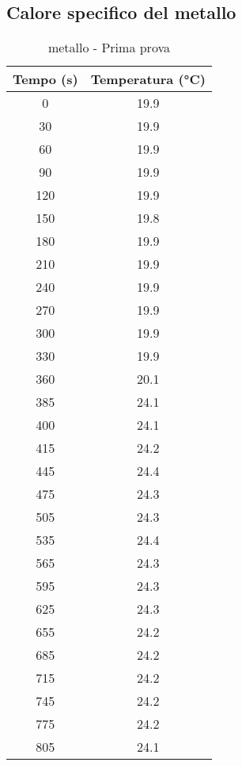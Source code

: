 \documentclass[10pt,twocolumn]{article}
\begin{document}
\subsection{Calore specifico del metallo}
\begin{table}[H]
    \begin{minipage}{0.5\textwidth}
\centering
\caption*{metallo - Prima prova}
\begin{tabular}{|c|c|}
\hline
{Tempo (s)} & {Temperatura (°C)} \\ 
\hline
0         & 19.9 \\ \hline 
30        & 19.9 \\ \hline 
60        & 19.9 \\ \hline 
90        & 19.9 \\ \hline 
120       & 19.9 \\ \hline 
150       & 19.8 \\ \hline 
180       & 19.9 \\ \hline 
210       & 19.9 \\ \hline 
240       & 19.9 \\ \hline 
270       & 19.9 \\ \hline 
300       & 19.9 \\ \hline 
330       & 19.9 \\ \hline 
360       & 20.1 \\ \hline 
385       & 24.1 \\ \hline 
400       & 24.1 \\ \hline 
415       & 24.2 \\ \hline 
445       & 24.4 \\ \hline 
475       & 24.3 \\ \hline 
505       & 24.3 \\ \hline 
535       & 24.4 \\ \hline 
565       & 24.3 \\ \hline 
595       & 24.3 \\ \hline 
625       & 24.3 \\ \hline 
655       & 24.2 \\ \hline 
685       & 24.2 \\ \hline 
715       & 24.2 \\ \hline 
745       & 24.2 \\ \hline 
775       & 24.2 \\ \hline 
805       & 24.1 \\ \hline 
\end{tabular}
\label{tab:temperatura}
\end{minipage}

\end{table}
\end{document}
